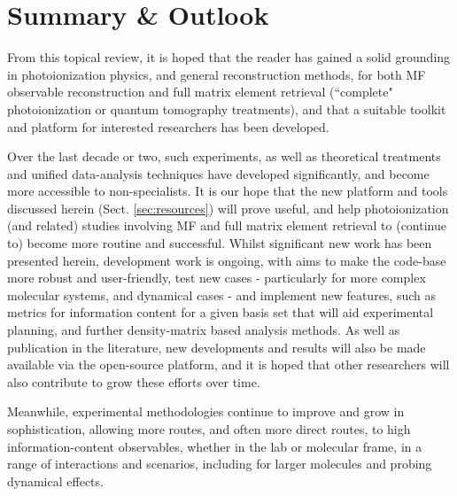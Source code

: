 

\section{Summary \& Outlook \label{sec:summary-outlook}}

From this topical review, it is hoped that the reader has gained a solid grounding in photoionization physics, and general reconstruction methods, for both MF observable reconstruction and full matrix element retrieval (``complete" photoionization or quantum tomography treatments), and that a suitable toolkit and platform for interested researchers has been developed. 

Over the last decade or two, such experiments, as well as theoretical treatments and unified data-analysis techniques have developed significantly, and become more accessible to non-specialists. It is our hope 
that the new platform and tools discussed herein (Sect. \ref{sec:resources}) will prove useful, and help photoionization (and related) studies involving MF and full matrix element retrieval to (continue to) become more routine and successful. Whilst significant new work has been presented herein, development work is ongoing, with aims to make the code-base more robust and user-friendly, test new cases - particularly for more complex molecular systems, and dynamical cases - and implement new features, such as metrics for information content for a given basis set that will aid experimental planning, and further density-matrix based analysis methods. As well as publication in the literature, new developments and results will also be made available via the open-source platform, and it is hoped that other researchers will also contribute to grow these efforts over time.

Meanwhile, experimental methodologies continue to improve and grow in sophistication, allowing more routes, and often more direct routes, to high information-content observables, whether in the lab or molecular frame, in a range of interactions and scenarios, including for larger molecules and probing dynamical effects. 


